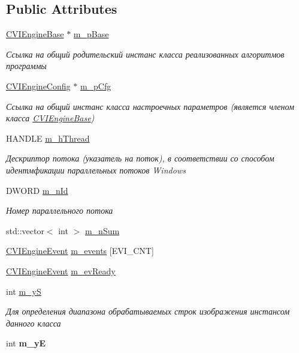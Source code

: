 \subsection*{Public Attributes}
\begin{DoxyCompactItemize}
\item 
\hyperlink{class_c_v_i_engine_base}{C\+V\+I\+Engine\+Base} $\ast$ \hyperlink{class_c_v_i_engine_thread_a771ad7767cb35813f6671f497b075496}{m\+\_\+p\+Base}
\begin{DoxyCompactList}\small\item\em Ссылка на общий родительский инстанс класса реализованных алгоритмов программы \end{DoxyCompactList}\item 
\hyperlink{class_c_v_i_engine_config}{C\+V\+I\+Engine\+Config} $\ast$ \hyperlink{class_c_v_i_engine_thread_ac297ce260db221d74422e3c7e8e03e27}{m\+\_\+p\+Cfg}
\begin{DoxyCompactList}\small\item\em Ссылка на общий инстанс класса настроечных параметров (является членом класса \hyperlink{class_c_v_i_engine_base}{C\+V\+I\+Engine\+Base}) \end{DoxyCompactList}\item 
H\+A\+N\+D\+L\+E \hyperlink{class_c_v_i_engine_thread_a1ac54d72e0fe75fff96d82b115df962c}{m\+\_\+h\+Thread}
\begin{DoxyCompactList}\small\item\em Дескриптор потока (указатель на поток), в соответствии со способом идентмфикации параллельных потоков Windows \end{DoxyCompactList}\item 
D\+W\+O\+R\+D \hyperlink{class_c_v_i_engine_thread_a9cc3627d5a28cc22d6e33cdb052a7f4d}{m\+\_\+n\+Id}
\begin{DoxyCompactList}\small\item\em Номер параллельного потока \end{DoxyCompactList}\item 
std\+::vector$<$ int $>$ \hyperlink{class_c_v_i_engine_thread_a8b580461aa6df1676e9e31b2a46bcc7e}{m\+\_\+n\+Sum}
\item 
\hyperlink{class_c_v_i_engine_event}{C\+V\+I\+Engine\+Event} \hyperlink{class_c_v_i_engine_thread_a6c0ce9aab9b56cdd97087404af92fbb0}{m\+\_\+events} \mbox{[}E\+V\+I\+\_\+\+C\+N\+T\mbox{]}
\item 
\hyperlink{class_c_v_i_engine_event}{C\+V\+I\+Engine\+Event} \hyperlink{class_c_v_i_engine_thread_af84f80046cb905dda7623ef8a2ea956b}{m\+\_\+ev\+Ready}
\item 
int \hyperlink{class_c_v_i_engine_thread_a19834ce7dacd0ff5d1cc4615c040830c}{m\+\_\+y\+S}
\begin{DoxyCompactList}\small\item\em Для определения диапазона обрабатываемых строк изображения инстансом данного класса \end{DoxyCompactList}\item 
\hypertarget{class_c_v_i_engine_thread_ae9849fe1f1cba016b9df4e33fd9c2092}{int {\bfseries m\+\_\+y\+E}}\label{class_c_v_i_engine_thread_ae9849fe1f1cba016b9df4e33fd9c2092}


\end{DoxyCompactItemize}

